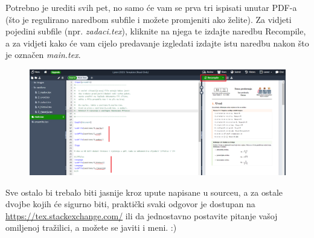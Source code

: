     Potrebno je urediti svih pet, no samo će vam se prva tri ispisati unutar PDF-a (što je regulirano naredbom \textsf{subfile} i možete promjeniti ako želite). Za vidjeti pojedini subfile (npr. \textit{zadaci.tex}), kliknite na njega te izdajte naredbu \textsf{Recompile}, a za vidjeti kako će vam cijelo predavanje izgledati izdajte istu naredbu nakon što je označen \textit{main.tex}. 
    
    \begin{figure}
        \centering
        \includegraphics[width = \textwidth]{images/Primjer_3.png}
    \end{figure}
    
    Sve ostalo bi trebalo biti jasnije kroz upute napisane u sourceu, a za ostale dvojbe kojih će sigurno biti, praktički svaki odgovor je dostupan na \url{https://tex.stackexchange.com/} ili da jednostavno postavite pitanje vašoj omiljenoj tražilici, a možete se javiti i meni. :) 
    
    \bigskip
    \printbibliography

